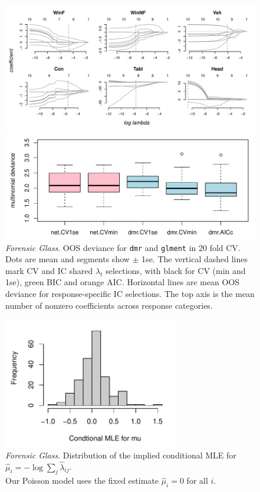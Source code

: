 \documentclass[12pt]{article}
\newcommand{\cd}[1]{{\tt#1}}
\begin{document}
\begin{figure}
\includegraphics[width=6.25in]{../graphs/fgl_coef}
\caption{\label{fgl_coef} {\it Forensic Glass}. Regularization paths for each glass-type response category.  AIC and BIC selections are marked with dashed vertical lines (orange and green respectively; they overlap for \cd{Tabl}).}
\vskip 1cm
\includegraphics[width=6.25in]{../graphs/fgl_cv}
\caption{\label{fgl_cv}  {\it Forensic Glass}. OOS deviance for \cd{dmr} and \cd{glment} in 20 fold CV.  Dots are mean and segments show $\pm$ 1se.  The vertical dashed lines mark CV and IC shared $\lambda_t$ selections, with black for CV (min and 1se), green BIC and orange AIC. Horizontal lines are mean OOS deviance for response-specific IC selections. The top axis is the mean number of nonzero coefficients across response categories.}
\end{figure}

\begin{figure}
\hskip 3cm\includegraphics[width=3in]{../graphs/fgl_mu}
\caption{\label{fgl_mu} {\it Forensic Glass}.  Distribution of the implied conditional MLE for $\hat{\mu}_i = -\log \sum_j \hat\lambda_{ij}$.  \\Our Poisson model uses the fixed estimate $\hat\mu_i = 0$ for all $i$. }
\end{figure}
\end{document}
